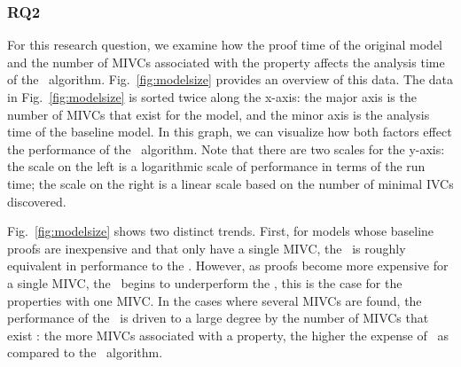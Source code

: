 %

\vspace{0.1in}
\subsubsection{RQ2} For this research question, we examine how the proof time of the original model and the number of MIVCs associated with the property affects the analysis time of the \aivcalg\ algorithm.  Fig.~\ref{fig:modelsize} provides an overview of this data.  The data in Fig.~\ref{fig:modelsize} is sorted twice along the x-axis: the major axis is the number of MIVCs that exist for the model, and the minor axis is the analysis time of the baseline model.  In this graph, we can visualize how both factors effect the performance of the \aivcalg\ algorithm.  Note that there are two scales for the y-axis: the scale on the left is a logarithmic scale of performance in terms of the run time; the scale on the right is a linear scale based on the number of minimal IVCs discovered.

Fig.~\ref{fig:modelsize} shows two distinct trends.  First, for models whose baseline proofs are inexpensive and that only have a single MIVC, the \aivcalg\ is roughly equivalent in performance to the \ucbfalg.  %
However, as proofs become more expensive for a single MIVC, the \aivcalg\ begins to underperform the \ucbfalg , this is the case for the properties with one MIVC.  In the cases where several MIVCs are found, the performance of the \aivcalg\ is driven to a large degree by the number of MIVCs that exist : the more MIVCs associated with a property, the higher the expense of \aivcalg\ as compared to the \ucbfalg\ algorithm. %

